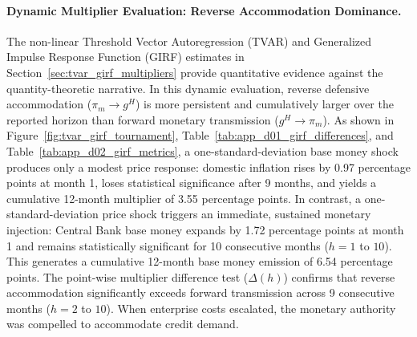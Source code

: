 \paragraph{Dynamic Multiplier Evaluation: Reverse Accommodation Dominance.}
The non-linear Threshold Vector Autoregression (TVAR) and Generalized Impulse Response Function (GIRF) estimates in Section~\ref{sec:tvar_girf_multipliers} provide quantitative evidence against the quantity-theoretic narrative. In this dynamic evaluation, reverse defensive accommodation ($\pi_m \to g^H$) is more persistent and cumulatively larger over the reported horizon than forward monetary transmission ($g^H \to \pi_m$). As shown in Figure~\ref{fig:tvar_girf_tournament}, Table~\ref{tab:app_d01_girf_differences}, and Table~\ref{tab:app_d02_girf_metrics}, a one-standard-deviation base money shock produces only a modest price response: domestic inflation rises by 0.97 percentage points at month 1, loses statistical significance after 9 months, and yields a cumulative 12-month multiplier of 3.55 percentage points. In contrast, a one-standard-deviation price shock triggers an immediate, sustained monetary injection: Central Bank base money expands by 1.72 percentage points at month 1 and remains statistically significant for 10 consecutive months ($h=1$ to $10$). This generates a cumulative 12-month base money emission of 6.54 percentage points. The point-wise multiplier difference test ($\Delta(h)$) confirms that reverse accommodation significantly exceeds forward transmission across 9 consecutive months ($h=2$ to $10$). When enterprise costs escalated, the monetary authority was compelled to accommodate credit demand.

